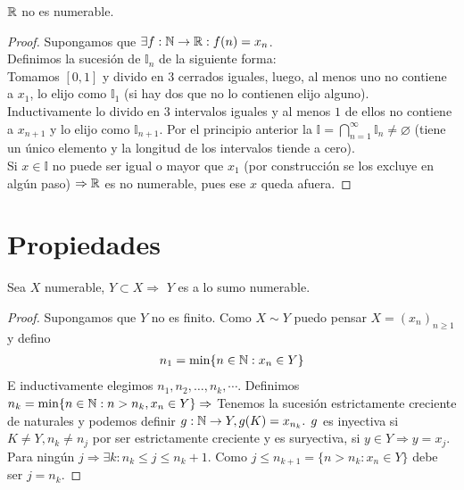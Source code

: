 \begin{theorem}
    \(\mathbb{R} \)  no es numerable.
    \begin{proof}
        Supongamos que \(\exists f:\mathbb{N} \to \mathbb{R} : f(n) = x_n\). \\
        Definimos la sucesión de \(\mathbb{I}_n\) de la siguiente forma: \\
        Tomamos \([0, 1]\) y divido en \(3\) cerrados iguales, luego, al menos uno no contiene a \(x_1\), lo elijo como \(\mathbb{I}_1\) (si  hay dos que no lo contienen elijo alguno). Inductivamente lo divido en \(3\) intervalos iguales y al menos \(1\) de ellos no contiene a \(x_{n+1} \) y lo elijo como \(\mathbb{I}_{n+1} \). Por el principio anterior la \(\mathbb{I} = \bigcap_{n=1}^\infty \mathbb{I}_n \neq \varnothing \) (tiene un único elemento y la longitud de los intervalos tiende a cero). \\
        Si \(x \in \mathbb{I} \) no puede ser igual o mayor que \(x_1\) (por construcción se los excluye en algún paso) \(\Rightarrow \mathbb{R} \) es no numerable, pues ese \(x\) queda afuera.
    \end{proof}
\end{theorem}

\section{Propiedades}

\begin{theorem}
    Sea \(X\) numerable, \(Y \subset X \Rightarrow \) \(Y\) es a lo sumo numerable.
    \begin{proof}
        Supongamos que \(Y\) no es finito. Como \(X \sim Y\) puedo pensar \(X = {(x_n)}_{n\geq1} \) y defino
        \begin{align*}
            n_1= \min \{ n \in \mathbb{N}: x_n \in Y \}
        \end{align*}
        E inductivamente elegimos \(n_1, n_2, \ldots , n_k, \cdots \). Definimos \(n_k = \min \{ n \in \mathbb{N} : n > n_k, x_n \in Y \} \Rightarrow \) Tenemos la sucesión estrictamente creciente de naturales y podemos definir \(g: \mathbb{N} \to Y, g(K) = x_{n_k} \text{. } g\) es inyectiva si \(K\neq Y, n_k \neq n_j\) por ser estrictamente creciente y es suryectiva, si \(y \in Y \Rightarrow y = x_j\). Para ningún \(j \Rightarrow \exists k :n_k\leq j \leq n_k+1\). Como \(j \leq n_{k+1}=\{ n>n_k:x_n \in Y \} \) debe ser \(j = n_k\).
    \end{proof}
\end{theorem}

